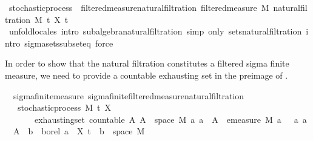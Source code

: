 \begin{isabellebody}
\isanewline
\isanewline
{}\isamarkupfalse%
\ stochastic{\isacharunderscore}{\kern0pt}process\ {\isasymsubseteq}\ filtered{\isacharunderscore}{\kern0pt}measure{\isacharunderscore}{\kern0pt}natural{\isacharunderscore}{\kern0pt}filtration{\isacharcolon}{\kern0pt}\ filtered{\isacharunderscore}{\kern0pt}measure\ M\ {\isachardoublequoteopen}natural{\isacharunderscore}{\kern0pt}filtration\ M\ t\ X{\isachardoublequoteclose}\ t\isanewline
%
\isadelimproof
\ \ \ \ %
\endisadelimproof
%
\isatagproof
{}\isamarkupfalse%
\ {\isacharparenleft}{\kern0pt}unfold{\isacharunderscore}{\kern0pt}locales{\isacharparenright}{\kern0pt}\ {\isacharparenleft}{\kern0pt}intro\ subalgebra{\isacharunderscore}{\kern0pt}natural{\isacharunderscore}{\kern0pt}filtration{\isacharcomma}{\kern0pt}\ simp\ only{\isacharcolon}{\kern0pt}\ sets{\isacharunderscore}{\kern0pt}natural{\isacharunderscore}{\kern0pt}filtration{\isacharcomma}{\kern0pt}\ intro\ sigma{\isacharunderscore}{\kern0pt}sets{\isacharunderscore}{\kern0pt}subseteq{\isacharcomma}{\kern0pt}\ force{\isacharparenright}{\kern0pt}%
\endisatagproof
{\isafoldproof}%
%
\isadelimproof
%
\endisadelimproof
%
\begin{isamarkuptext}%
In order to show that the natural filtration constitutes a filtered sigma finite measure, we need to provide a countable exhausting set in the preimage of .%
\end{isamarkuptext}\isamarkuptrue%
\isamarkupfalse%
\ {\isacharparenleft}{\kern0pt}\ sigma{\isacharunderscore}{\kern0pt}finite{\isacharunderscore}{\kern0pt}measure{\isacharparenright}{\kern0pt}\ sigma{\isacharunderscore}{\kern0pt}finite{\isacharunderscore}{\kern0pt}filtered{\isacharunderscore}{\kern0pt}measure{\isacharunderscore}{\kern0pt}natural{\isacharunderscore}{\kern0pt}filtration{\isacharcolon}{\kern0pt}\isanewline
\ \ \ {\isachardoublequoteopen}stochastic{\isacharunderscore}{\kern0pt}process\ M\ t\ X{\isachardoublequoteclose}\isanewline
\ \ \ \ \ \ \ exhausting{\isacharunderscore}{\kern0pt}set{\isacharcolon}{\kern0pt}\ {\isachardoublequoteopen}countable\ A{\isachardoublequoteclose}\ {\isachardoublequoteopen}{\isacharparenleft}{\kern0pt}{\isasymUnion}A{\isacharparenright}{\kern0pt}\ {\isacharequal}{\kern0pt}\ space\ M{\isachardoublequoteclose}\ {\isachardoublequoteopen}{\isasymAnd}a{\isachardot}{\kern0pt}\ a\ {\isasymin}\ A\ {\isasymLongrightarrow}\ emeasure\ M\ a\ {\isasymnoteq}\ {\isasyminfinity}{\isachardoublequoteclose}\ {\isachardoublequoteopen}{\isasymAnd}a{\isachardot}{\kern0pt}\ a\ {\isasymin}\ A\ {\isasymLongrightarrow}\ {\isasymexists}b\ {\isasymin}\ borel{\isachardot}{\kern0pt}\ a\ {\isacharequal}{\kern0pt}\ X\ t\ {\isacharminus}{\kern0pt}{\isacharbackquote}{\kern0pt}\ b\ {\isasyminter}\ space\ M{\isachardoublequoteclose}\isanewline

\end{isabellebody}
